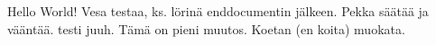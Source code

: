 \documentclass{article}
\begin{document}
Hello World!
Vesa testaa, ks. lörinä enddocumentin jälkeen.
Pekka säätää ja vääntää. testi
juuh.
Tämä on pieni muutos.
Koetan (en koita) muokata.
\end{document}
